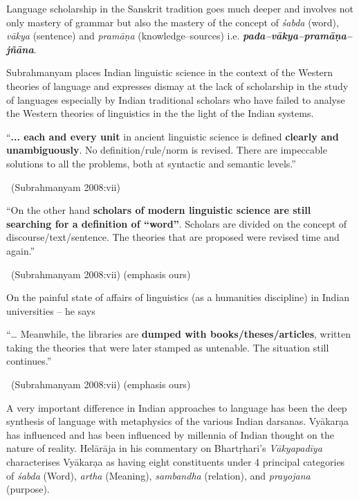 Language scholarship in the Sanskrit tradition goes much deeper and involves not only mastery of grammar but also the mastery of the concept of \textit{śabda} (word), \textit{vākya} (sentence) and \textit{pramāṇa} (knowledge–sources) i.e. \textbf{\textit{pada–vākya–pramāṇa–jñāna}}.

Subrahmanyam places Indian linguistic science in the context of the Western theories of language and expresses dismay at the lack of scholarship in the study of languages especially by Indian traditional scholars who have failed to analyse the Western theories of linguistics in the the light of the Indian systems.

\begin{myquote}
“\textbf{... each and every unit} in ancient linguistic science is defined \textbf{clearly and unambiguously}. No definition/rule/norm is revised. There are impeccable solutions to all the problems, both at syntactic and semantic levels.”

~\hfill (Subrahmanyam 2008:vii)
\end{myquote}

\begin{myquote}
“On the other hand \textbf{scholars of modern linguistic science are still searching for a definition of “word”}. Scholars are divided on the concept of discourse/text/sentence. The theories that are proposed were revised time and again.”

~\hfill (Subrahmanyam 2008:vii) (emphasis ours)
\end{myquote}

On the painful state of affairs of linguistics (as a humanities discipline) in Indian universities – he says

\begin{myquote}
“… Meanwhile, the libraries are \textbf{dumped with books/theses/articles}, written taking the theories that were later stamped as untenable. The situation still continues.”

~\hfill (Subrahmanyam 2008:vii) (emphasis ours)
\end{myquote}

A very important difference in Indian approaches to language has been the deep synthesis of language with metaphysics of the various Indian darsanas. Vyākarạa has influenced and has been influenced by millennia of Indian thought on the nature of reality. Helārāja in his commentary on Bhartṛhari’s \textit{Vākyapadīya} characterises Vyākarạa as having eight constituents under 4 principal categories of \textit{śabda} (Word), \textit{artha} (Meaning), \textit{sambandha} (relation), and \textit{prayojana} (purpose).

